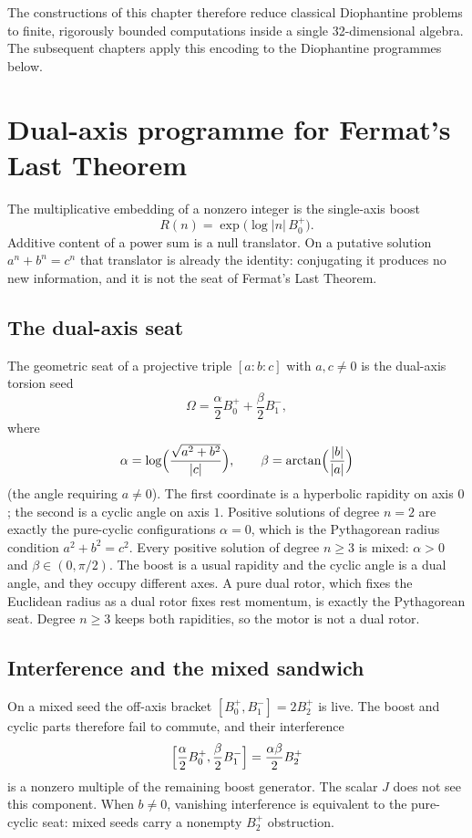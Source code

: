\documentclass[a4paper]{article}
\theoremstyle{definition}
\theoremstyle{remark}
\begin{document}
The constructions of this chapter therefore reduce classical Diophantine problems to finite, rigorously bounded computations inside a single 32-dimensional algebra. The subsequent chapters apply this encoding to the Diophantine programmes below.

\section{Dual-axis programme for Fermat's Last Theorem}

The multiplicative embedding of a nonzero integer is the single-axis boost
\[
R(n)=\exp\bigl(\log|n|\,B^+_0\bigr).
\]
Additive content of a power sum is a null translator. On a putative solution \(a^n+b^n=c^n\) that translator is already the identity: conjugating it produces no new information, and it is not the seat of Fermat's Last Theorem.

\subsection{The dual-axis seat}

The geometric seat of a projective triple \([a:b:c]\) with \(a,c\neq 0\) is the dual-axis torsion seed
\[
\Omega=\frac{\alpha}{2}B^+_0+\frac{\beta}{2}B^-_1,
\]
where
\[
\alpha=\log\Bigl(\frac{\sqrt{a^2+b^2}}{|c|}\Bigr),\qquad
\beta=\arctan\Bigl(\frac{|b|}{|a|}\Bigr)
\]
(the angle requiring \(a\neq 0\)). The first coordinate is a hyperbolic rapidity on axis \(0\); the second is a cyclic angle on axis \(1\). Positive solutions of degree \(n=2\) are exactly the pure-cyclic configurations \(\alpha=0\), which is the Pythagorean radius condition \(a^2+b^2=c^2\). Every positive solution of degree \(n\ge 3\) is mixed: \(\alpha>0\) and \(\beta\in(0,\pi/2)\). The boost is a usual rapidity and the cyclic angle is a dual angle, and they occupy different axes. A pure dual rotor, which fixes the Euclidean radius as a dual rotor fixes rest momentum, is exactly the Pythagorean seat. Degree \(n\ge 3\) keeps both rapidities, so the motor is not a dual rotor.

\subsection{Interference and the mixed sandwich}

On a mixed seed the off-axis bracket \([B^+_0,B^-_1]=2B^+_2\) is live. The boost and cyclic parts therefore fail to commute, and their interference
\[
\Bigl[\frac{\alpha}{2}B^+_0,\frac{\beta}{2}B^-_1\Bigr]=\frac{\alpha\beta}{2}B^+_2
\]
is a nonzero multiple of the remaining boost generator. The scalar \(J\) does not see this component. When \(b\neq 0\), vanishing interference is equivalent to the pure-cyclic seat: mixed seeds carry a nonempty \(B^+_2\) obstruction.
\end{document}
